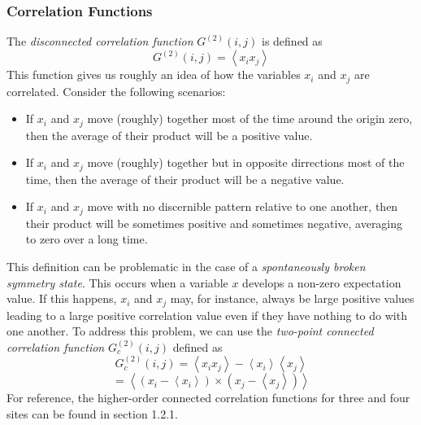 \documentclass{article}
\begin{document}
\subsubsection{Correlation Functions}
The \emph{disconnected correlation function} $G^{(2)}(i,j)$ is defined as
$$G^{(2)}(i,j) = \left \langle x_{i}x_{j} \right \rangle$$
This function gives us roughly an idea of how the variables $x_{i}$ and $x_{j}$
are correlated. Consider the following scenarios:
\begin{itemize}
\item If $x_{i}$ and $x_{j}$ move (roughly) together most of the time around
the origin zero, then the average of their product will be a positive value.
\item If $x_{i}$ and $x_{j}$ move (roughly) together but in opposite dirrections
most of the time, then the average of their product will be a negative value.
\item If $x_{i}$ and $x_{j}$ move with no discernible pattern relative to one
another, then their product will be sometimes positive and sometimes negative,
averaging to zero over a long time.
\end{itemize}

This definition can be problematic in the case of a \emph{spontaneously
broken symmetry state}. This occurs when a variable $x$ develops a non-zero
expectation value. If this happens, $x_{i}$ and $x_{j}$ may, for instance,
always be large positive values leading to a large positive correlation value
even if they have nothing to do with one another. To address this problem, we
can use the \emph{two-point connected correlation function} $G_{c}^{(2)}(i,j)$
defined as
$$G_{c}^{(2)}(i,j) = \left \langle x_{i}x_{j} \right \rangle - \left \langle x_{i} \right \rangle \left \langle x_{j} \right \rangle$$
$$ = \left \langle (x_{i} - \left \langle x_{i} \right \rangle) \times (x_{j} - \left \langle x_{j} \right \rangle) \right \rangle $$
For reference, the higher-order connected correlation functions for three and four sites can be found in
section 1.2.1.
\end{document}
